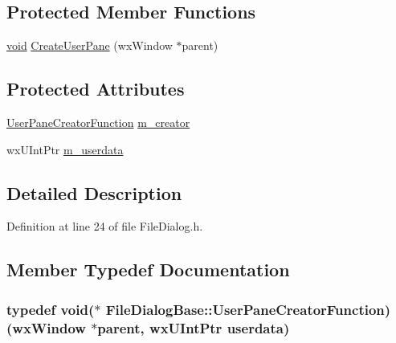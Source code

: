 \subsection*{Protected Member Functions}
\begin{DoxyCompactItemize}
\item 
\hyperlink{sound_8c_ae35f5844602719cf66324f4de2a658b3}{void} \hyperlink{class_file_dialog_base_a7cf9d3c84d7c8fc505181d10c1f26728}{Create\+User\+Pane} (wx\+Window $\ast$parent)
\end{DoxyCompactItemize}
\subsection*{Protected Attributes}
\begin{DoxyCompactItemize}
\item 
\hyperlink{class_file_dialog_base_a40a1c0cab71c92fb6b84b2d49dbf86a6}{User\+Pane\+Creator\+Function} \hyperlink{class_file_dialog_base_acefe406967af6b4fc57deeb13b067187}{m\+\_\+creator}
\item 
wx\+U\+Int\+Ptr \hyperlink{class_file_dialog_base_a95a0ee0625b9bb5ebd397feda56adc2f}{m\+\_\+userdata}
\end{DoxyCompactItemize}


\subsection{Detailed Description}


Definition at line 24 of file File\+Dialog.\+h.



\subsection{Member Typedef Documentation}
\subsubsection[{\texorpdfstring{User\+Pane\+Creator\+Function}{UserPaneCreatorFunction}}]{\setlength{\rightskip}{0pt plus 5cm}typedef {\bf void}($\ast$ File\+Dialog\+Base\+::\+User\+Pane\+Creator\+Function) (wx\+Window $\ast$parent, wx\+U\+Int\+Ptr userdata)}\hypertarget{class_file_dialog_base_a40a1c0cab71c92fb6b84b2d49dbf86a6}{}\label{class_file_dialog_base_a40a1c0cab71c92fb6b84b2d49dbf86a6}


